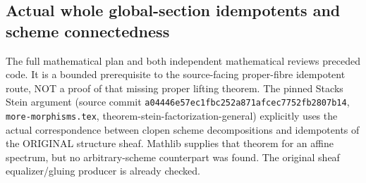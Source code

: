 \subsection{Actual whole global-section idempotents and scheme connectedness}

The full mathematical plan and both independent mathematical reviews preceded code. It is a bounded prerequisite to the
source-facing proper-fibre idempotent route, NOT a proof of that missing
proper lifting theorem. The pinned Stacks Stein argument (source commit
\texttt{a04446e57ec1fbc252a871afcec7752fb2807b14},
\texttt{more-morphisms.tex}, theorem-stein-factorization-general) explicitly
uses the actual correspondence between clopen scheme decompositions and
idempotents of the ORIGINAL structure sheaf. Mathlib supplies that theorem
for an affine spectrum, but no arbitrary-scheme counterpart was found.
The original sheaf equalizer/gluing producer is already checked.

